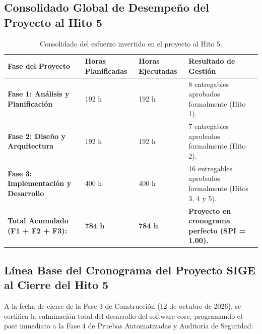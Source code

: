\documentclass[12pt,a4paper]{article}
\begin{document}
\subsection{Consolidado Global de Desempeño del Proyecto al Hito 5}
\begin{table}[H]
\centering
\small
\renewcommand{\arraystretch}{1.2}
\begin{tabularx}{\textwidth}{|>{\hsize=1.1\hsize\raggedright\arraybackslash\bfseries\footnotesize}X|>{\hsize=0.45\hsize\centering\arraybackslash\footnotesize}X|>{\hsize=0.45\hsize\centering\arraybackslash\footnotesize}X|>{\hsize=2.0\hsize\raggedright\arraybackslash\footnotesize}X|}
\hline
\rowcolor{tableheader}
\textbf{Fase del Proyecto} & \textbf{Horas Planificadas} & \textbf{Horas Ejecutadas} & \textbf{Resultado de Gestión} \\
\hline
Fase 1: Análisis y Planificación & 192 h & 192 h & 8 entregables aprobados formalmente (Hito 1). \\
\hline
Fase 2: Diseño y Arquitectura & 192 h & 192 h & 7 entregables aprobados formalmente (Hito 2). \\
\hline
Fase 3: Implementación y Desarrollo & 400 h & 400 h & 16 entregables aprobados formalmente (Hitos 3, 4 y 5). \\
\hline
\textbf{Total Acumulado (F1 + F2 + F3):} & \textbf{784 h} & \textbf{784 h} & \textbf{Proyecto en cronograma perfecto (SPI = 1.00).} \\
\hline
\end{tabularx}
\caption{Consolidado del esfuerzo invertido en el proyecto al Hito 5.}
\end{table}

\subsection{Línea Base del Cronograma del Proyecto SIGE al Cierre del Hito 5}
A la fecha de cierre de la Fase 3 de Construcción (12 de octubre de 2026), se certifica la culminación total del desarrollo del software core, programando el pase inmediato a la Fase 4 de Pruebas Automatizadas y Auditoría de Seguridad:
\end{document}
